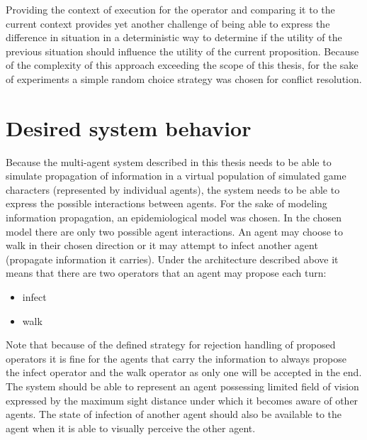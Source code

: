 Providing the context of execution for the operator and comparing it to the current context provides yet another challenge of being able to express the difference in situation in a deterministic way to determine if the utility of the previous situation should influence the utility of the current proposition.
Because of the complexity of this approach exceeding the scope of this thesis, for the sake of experiments a simple random choice strategy was chosen for conflict resolution.

\section{Desired system behavior}

Because the multi-agent system described in this thesis needs to be able to simulate propagation of information in a virtual population of simulated game characters (represented by individual agents), the system needs to be able to express the possible interactions between agents.
For the sake of modeling information propagation, an epidemiological model was chosen.
In the chosen model there are only two possible agent interactions.
An agent may choose to walk in their chosen direction or it may attempt to infect another agent (propagate information it carries).
Under the architecture described above it means that there are two operators that an agent may propose each turn:

\begin{itemize}
    \item infect
    \item walk
\end{itemize}

Note that because of the defined strategy for rejection handling of proposed operators it is fine for the agents that carry the information to always propose the infect operator and the walk operator as only one will be accepted in the end.
The system should be able to represent an agent possessing limited field of vision expressed by the maximum sight distance under which it becomes aware of other agents.
The state of infection of another agent should also be available to the agent when it is able to visually perceive the other agent.


